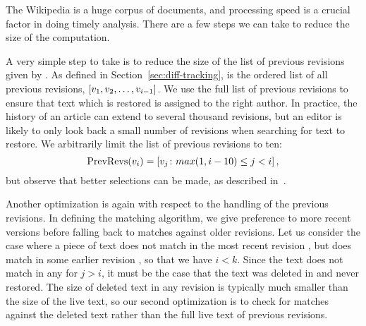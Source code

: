 The Wikipedia is a huge corpus of documents, and processing speed
is a crucial factor in doing timely analysis.
There are a few steps we can take to reduce the size of the computation.

A very simple step to take is to reduce the size of the list of
previous revisions given by .
As defined in Section~\ref{sec:diff-tracking},  
is the ordered list of all previous revisions,
$\left[ v_{1}, v_{2}, \ldots, v_{i-1} \right]$.
We use the full list of previous revisions to ensure that text which
is restored is assigned to the right author.
In practice, the history of an article can extend to several thousand
revisions, but an editor is likely to only look back a small number
of revisions when searching for text to restore.
We arbitrarily limit the list of previous revisions to ten:
\begin{equation*}
    \mathrm{PrevRevs}(v_{i}) = \left[ v_{j} \colon
	max(1,i-10) \le j < i \right],
\end{equation*}
but observe that better selections can be made, as described
in~\cite{Chatterjee2008}.

Another optimization is again with respect to the handling of the
previous revisions.
In defining the matching algorithm, we give preference to more recent
versions before falling back to matches against older revisions.
Let us consider the case where a piece of text does not match in the
most recent revision ,
but does match in some earlier revision , so that we have $i < k$.
Since the text does not match in any  for $j > i$,
it must be the case that the text was deleted in  and
never restored.
The size of deleted text in any revision is typically much smaller
than the size of the live text, so our second optimization is
to check for matches against the deleted text rather than the full
live text of previous revisions.


